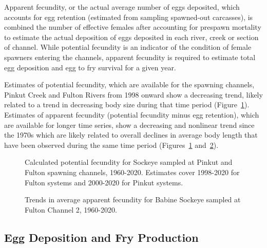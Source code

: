 \documentclass[french,11pt]{book}
\begin{document}
Apparent fecundity, or the actual average number of eggs deposited, which accounts for egg retention (estimated from sampling spawned-out carcasses), is combined the number of effective females after accounting for prespawn mortality to estimate the actual deposition of eggs deposited in each river, creek or section of channel. While potential fecundity is an indicator of the condition of female spawners entering the channels, apparent fecundity is required to estimate total egg deposition and egg to fry survival for a given year.

Estimates of potential fecundity, which are available for the spawning channels, Pinkut Creek and Fulton Rivers from 1998 onward show a decreasing trend, likely related to a trend in decreasing body size during that time period (Figure~\ref{fig:PotentialFecundity}). Estimates of apparent fecundity (potential fecundity minus egg retention), which are available for longer time series, show a decreasing and nonlinear trend since the 1970s which are likely related to overall declines in average body length that have been observed during the same time period (Figures~\ref{fig:PotentialFecundity} and~\ref{fig:ReducedFecundity}).


\begin{figure}[htb]

{\centering {} 

}

\caption{Calculated potential fecundity for Sockeye sampled at Pinkut and Fulton spawning channels, 1960-2020. Estimates cover 1998-2020 for Fulton systems and 2000-2020 for Pinkut systems.}\label{fig:PotentialFecundity}
\end{figure}

\begin{figure}[htb]

{\centering {} 

}

\caption{Trends in average apparent fecundity for Babine Sockeye sampled at Fulton Channel 2, 1960-2020.}\label{fig:ReducedFecundity}
\end{figure}
\subsection{Egg Deposition and Fry Production}\label{egg-deposition-and-fry-production}
\end{document}
